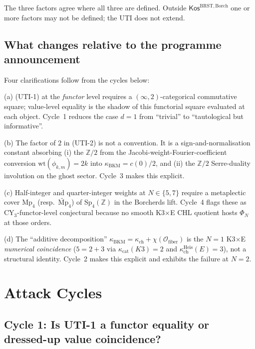 \documentclass[11pt]{article}
\theoremstyle{definition}
\newcommand{\kch}{\kappa_{\mathrm{ch}}}
\newcommand{\kcat}{\kappa_{\mathrm{cat}}}
\newcommand{\kBKM}{\kappa_{\mathrm{BKM}}}
\newcommand{\BRST}{\mathrm{BRST}}
\begin{document}
The three factors agree where all three are defined. Outside
$\mathsf{Kos}^{\BRST,\mathrm{Borch}}$ one or more factors may not be
defined; the UTI does not extend.

\subsection{What changes relative to the programme announcement}

Four clarifications follow from the cycles below:

(a) (UTI-1) at the \emph{functor} level requires a $(\infty, 2)$-categorical
commutative square; value-level equality is the shadow of this functorial
square evaluated at each object. Cycle~1 reduces the case $d = 1$ from
``trivial'' to ``tautological but informative''.

(b) The factor of $2$ in (UTI-2) is not a convention. It is a
sign-and-normalisation constant absorbing (i) the $\mathbb{Z}/2$ from the
Jacobi-weight-Fourier-coefficient conversion $\mathrm{wt}(\phi_{k,m}) = 2k$
into $\kBKM = c(0)/2$, and (ii) the $\mathbb{Z}/2$ Serre-duality involution
on the ghost sector. Cycle~3 makes this explicit.

(c) Half-integer and quarter-integer weights at $N \in \{5, 7\}$
require a metaplectic cover $\mathrm{Mp}_4$ (resp.\ $\widetilde{\mathrm{Mp}}_4$)
of $\mathrm{Sp}_4(\mathbb{Z})$ in the Borcherds lift. Cycle~4 flags
these as CY$_3$-functor-level conjectural because no smooth K3$\times$E
CHL quotient hosts $\Phi_N$ at those orders.

(d) The ``additive decomposition'' $\kBKM = \kch + \chi(\mathcal{O}_{\mathrm{fiber}})$
is the $N = 1$ K3$\times$E \emph{numerical coincidence} ($5 = 2 + 3$ via
$\kcat(K3) = 2$ and $\kch^{\mathrm{Heis}}(E) = 3$), not a structural identity.
Cycle~2 makes this explicit and exhibits the failure at $N = 2$.

\section{Attack Cycles}
\label{sec:attacks}

\subsection{Cycle 1: Is UTI-1 a functor equality or dressed-up value coincidence?}
\end{document}
